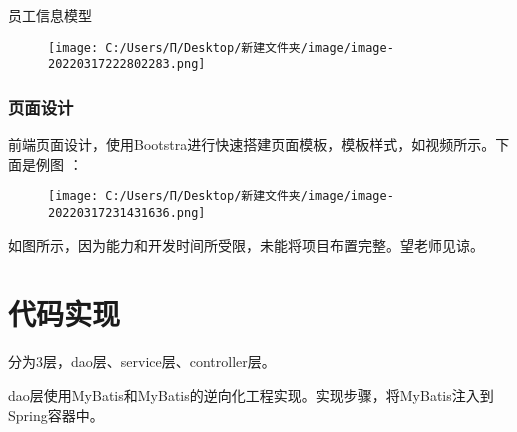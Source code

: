 \documentclass[
]{article}
\begin{document}
员工信息模型

\begin{figure}
\centering
\texttt{[image: C:/Users/Π/Desktop/新建文件夹/image/image-20220317222802283.png]}
\caption{}
\end{figure}

\hypertarget{ux9875ux9762ux8bbeux8ba1}{%
\subsubsection{页面设计}\label{ux9875ux9762ux8bbeux8ba1}}

前端页面设计，使用Bootstra进行快速搭建页面模板，模板样式，如视频所示。下面是例图
：

\begin{figure}
\centering
\texttt{[image: C:/Users/Π/Desktop/新建文件夹/image/image-20220317231431636.png]}
\caption{}
\end{figure}

如图所示，因为能力和开发时间所受限，未能将项目布置完整。望老师见谅。

\hypertarget{ux4ee3ux7801ux5b9eux73b0}{%
\section{代码实现}\label{ux4ee3ux7801ux5b9eux73b0}}

分为3层，dao层、service层、controller层。

dao层使用MyBatis和MyBatis的逆向化工程实现。实现步骤，将MyBatis注入到Spring容器中。
\end{document}
